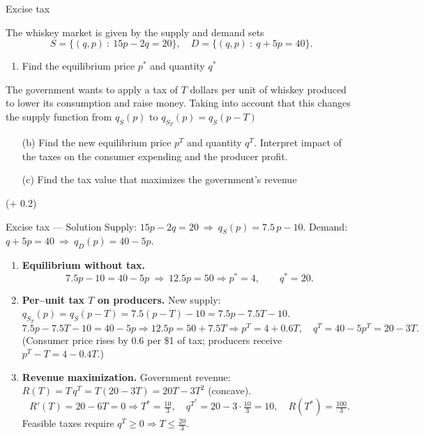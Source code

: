\documentclass[9pt]{beamer}
\begin{document}
\begin{frame}{Excise tax}

    The whiskey market is given by the supply and demand sets
    $$
    S = \{(q, p)\ :\ 15p - 2q = 20\}, \quad D = \{(q, p)\ :\ q + 5p = 40\}.
    $$
    \begin{enumerate}[leftmargin = 0.5cm, label = (\alph*), rightmargin = 0.2cm]
        \item Find the equilibrium price $p^*$ and quantity $q^*$
    \end{enumerate}
    The government wants to apply a tax of $T$ dollars per unit of whiskey produced to lower its consumption and raise money. Taking into account that this changes the supply function from $q_S(p)$ to $q_{S_T}(p) = q_S(p - T)$
    \begin{enumerate}[leftmargin = 0.5cm, label = (\alph*), rightmargin = 0.2cm]
        \item[(b)] Find the new equilibrium price $p^T$ and quantity $q^T$. Interpret impact of the taxes on the consumer expending and the producer profit.
        \item[(c)] Find the tax value that maximizes the government's revenue
    \end{enumerate}

    
     (+ 0.2)
    
\end{frame}

\begin{frame}{Excise tax — Solution}
\footnotesize
Supply: $15p-2q=20 \ \Rightarrow\ q_S(p)=7.5\,p-10$. \quad
Demand: $q+5p=40 \ \Rightarrow\ q_D(p)=40-5p$.

\begin{enumerate}[leftmargin=0.5cm, label=(\alph*), rightmargin=0.2cm]
  \item \textbf{Equilibrium without tax.}
  \[
    7.5p-10=40-5p \ \Rightarrow\ 12.5p=50 \Rightarrow
    \boxed{p^*=4},\qquad \boxed{q^*=20}.
  \]

  \item \textbf{Per–unit tax $T$ on producers.}
  New supply: $q_{S_T}(p)=q_S(p-T)=7.5(p-T)-10=7.5p-7.5T-10$.
  \[
    7.5p-7.5T-10=40-5p \Rightarrow 12.5p=50+7.5T
    \Rightarrow \boxed{p^T=4+0.6T},\quad
    \boxed{q^T=40-5p^T=20-3T}.
  \]
  (Consumer price rises by $0.6$ per \$1 of tax; producers receive $p^T-T=4-0.4T$.)

  \item \textbf{Revenue maximization.}
  Government revenue: $R(T)=T\,q^T=T(20-3T)=20T-3T^2$ (concave).
  \[
    R'(T)=20-6T=0 \Rightarrow \boxed{T^{*}=\tfrac{10}{3}},\quad
    q^{T^*}=20-3\cdot\tfrac{10}{3}=10,\quad
    R(T^*)=\boxed{\tfrac{100}{3}}.
  \]
  Feasible taxes require $q^T\ge0 \Rightarrow T\le \tfrac{20}{3}$.
\end{enumerate}
\end{frame}
\end{document}

